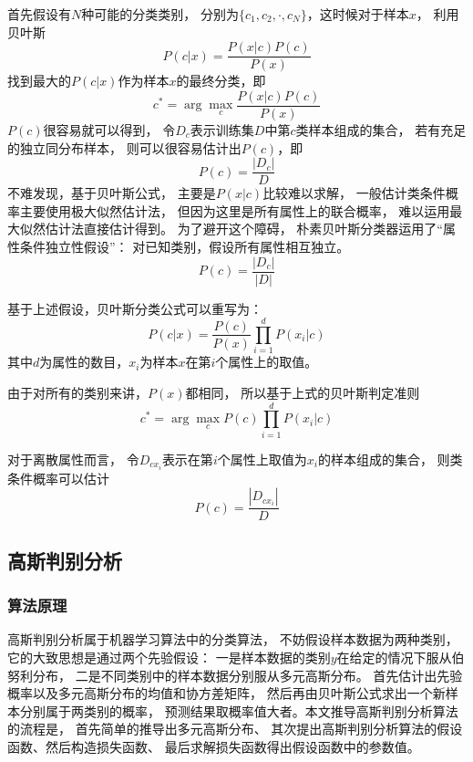 \documentclass[cn,hazy,blue,14pt,normal]{elegantnote}
\begin{document}
首先假设有$N$种可能的分类类别，
分别为$\{c_1,c_2, \cdot ,c_N\}$，这时候对于样本$x$，
利用贝叶斯
\begin{equation}
    P(c|x) = \frac{P(x|c)P(c)}{P(x)}
\end{equation}
找到最大的$P(c|x)$作为样本$x$的最终分类，即
\begin{equation}
    c^* = \arg\max_c\frac{P(x|c)P(c)}{P(x)}
\end{equation}
$P(c)$很容易就可以得到，
令$D_c$表示训练集$D$中第$c$类样本组成的集合，
若有充足的独立同分布样本，
则可以很容易估计出$P(c)$，即
\begin{equation}
    P(c) = \frac{ |D_c| }{D}
\end{equation}
不难发现，基于贝叶斯公式，
主要是$P(x|c)$比较难以求解，
一般估计类条件概率主要使用极大似然估计法，
但因为这里是所有属性上的联合概率，
难以运用最大似然估计法直接估计得到。
为了避开这个障碍，
朴素贝叶斯分类器运用了“属性条件独立性假设”：
对已知类别，假设所有属性相互独立。
\begin{equation}
    P(c) = \frac{ |D_c| }{|D|}
\end{equation}

基于上述假设，贝叶斯分类公式可以重写为：
\begin{equation}
    P(c|x) = \frac{P(c)}{P(x)}\prod_{i = 1}^d P(x_i|c)
\end{equation}
其中$d$为属性的数目，$x_i$为样本$x$在第$i$个属性上的取值。

由于对所有的类别来讲，$P(x)$都相同，
所以基于上式的贝叶斯判定准则
\begin{equation}
    c^* = \arg\max_c P(c)\prod_{i = 1}^d P(x_i|c)
\end{equation}

对于离散属性而言，
令$D_{cx_i}$表示在第$i$个属性上取值为$x_i$的样本组成的集合，
则类条件概率可以估计
\begin{equation}
    P(c) = \frac{ |D_{cx_i}| }{D}
\end{equation}


\subsection{高斯判别分析}
\subsubsection{算法原理}
高斯判别分析属于机器学习算法中的分类算法，
不妨假设样本数据为两种类别，
它的大致思想是通过两个先验假设：
一是样本数据的类别$y$在给定的情况下服从伯努利分布，
二是不同类别中的样本数据分别服从多元高斯分布。
首先估计出先验概率以及多元高斯分布的均值和协方差矩阵，
然后再由贝叶斯公式求出一个新样本分别属于两类别的概率，
预测结果取概率值大者。本文推导高斯判别分析算法的流程是，
首先简单的推导出多元高斯分布、
其次提出高斯判别分析算法的假设函数、然后构造损失函数、
最后求解损失函数得出假设函数中的参数值。
\end{document}
